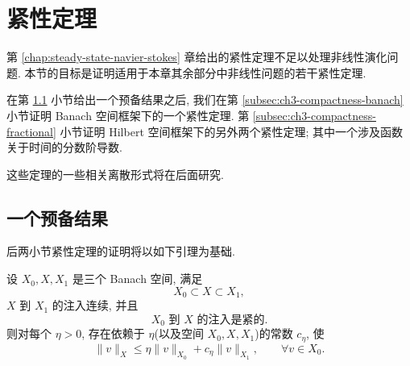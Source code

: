 \hypertarget{chapter-03-section-02-start}{}
\section{紧性定理}
\label{sec:ch3-compactness}
第 \ref{chap:steady-state-navier-stokes} 章给出的紧性定理不足以处理非线性演化问题. 本节的目标是证明适用于本章其余部分中非线性问题的若干紧性定理.

在第 \ref{subsec:ch3-compactness-preliminary} 小节给出一个预备结果之后, 我们在第 \ref{subsec:ch3-compactness-banach} 小节证明 Banach 空间框架下的一个紧性定理. 第 \ref{subsec:ch3-compactness-fractional} 小节证明 Hilbert 空间框架下的另外两个紧性定理; 其中一个涉及函数关于时间的分数阶导数.

这些定理的一些相关离散形式将在后面研究.

\hypertarget{chapter-03-page-198}{}
\subsection{一个预备结果}
\label{subsec:ch3-compactness-preliminary}
后两小节紧性定理的证明将以如下引理为基础.

\begin{Lemma}
\label{lem:ch3-compactness-interpolation}
设 $X_0,X,X_1$ 是三个 Banach 空间, 满足
\begin{equation}
X_0\subset X\subset X_1,
\label{eq:ch3-compactness-space-chain}
\end{equation}
$X$ 到 $X_1$ 的注入连续, 并且
\begin{equation}
X_0\text{ 到 }X\text{ 的注入是紧的}.
\label{eq:ch3-compactness-compact-injection}
\end{equation}
则对每个 $\eta>0$, 存在依赖于 $\eta$(以及空间 $X_0,X,X_1$)的常数 $c_\eta$, 使
\begin{equation}
\lVert v\rVert_X\leq \eta\lVert v\rVert_{X_0}+c_\eta\lVert v\rVert_{X_1},
\qquad\forall v\in X_0.
\label{eq:ch3-compactness-interpolation-inequality}
\end{equation}
\end{Lemma}

